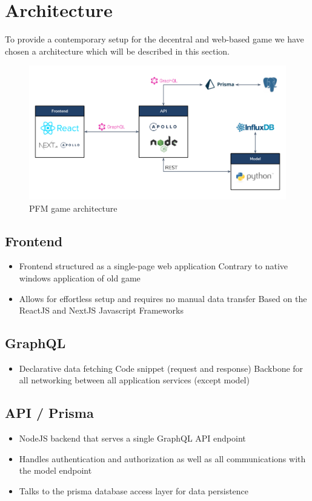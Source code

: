 \section{Architecture}
To provide a contemporary setup for the decentral and web-based game we have chosen a architecture which will be described in this section.

\begin{figure}[h!]
  \centering
  \includegraphics[scale=0.45]{img/architecture.png}
  \caption{PFM game architecture}
\end{figure}


\subsection{Frontend}
\begin{itemize}
  \item Frontend structured as a single-page web application
  \subitem Contrary to native windows application of old game
  \item Allows for effortless setup and requires no manual data transfer
  \subitem Based on the ReactJS and NextJS Javascript Frameworks
\end{itemize}

\subsection{GraphQL}
\begin{itemize}
  \item Declarative data fetching
  \subitem Code snippet (request and response)
  \subitem Backbone for all networking between all application services (except model)
\end{itemize}

\subsection{API / Prisma}
\begin{itemize}
  \item NodeJS backend that serves a single GraphQL API endpoint
  \item Handles authentication and authorization as well as all communications with the model endpoint
  \item Talks to the prisma database access layer for data persistence
\end{itemize}

